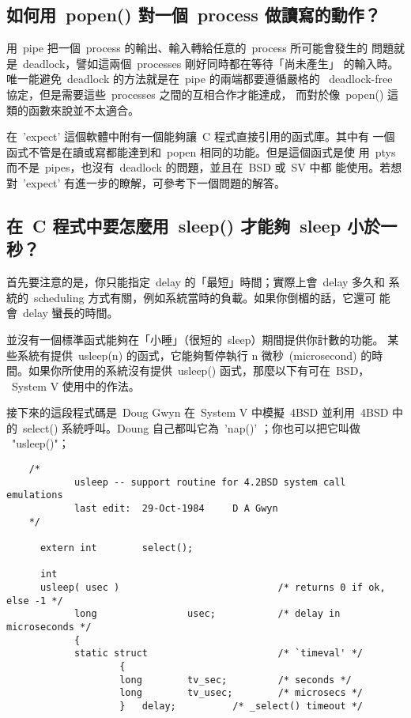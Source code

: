 \documentclass{article}
\begin{document}
\begin{CJK*}{Bg5}{ming}
\subsection{如何用~popen() 對一個~process 做讀寫的動作？}

	用~pipe 把一個~process 的輸出、輸入轉給任意的~process 所可能會發生的
        問題就是~deadlock，譬如這兩個~processes 剛好同時都在等待「尚未產生」
        的輸入時。唯一能避免~deadlock 的方法就是在~pipe 的兩端都要遵循嚴格的
	~deadlock-free 協定，但是需要這些~processes 之間的互相合作才能達成，
        而對於像~popen() 這類的函數來說並不太適合。

	在~'expect' 這個軟體中附有一個能夠讓~C 程式直接引用的函式庫。其中有
        一個函式不管是在讀或寫都能達到和~popen 相同的功能。但是這個函式是使
        用~ptys 而不是~pipes，也沒有~deadlock 的問題，並且在~BSD 或~SV 中都
        能使用。若想對~'expect' 有進一步的瞭解，可參考下一個問題的解答。

\subsection{在~C 程式中要怎麼用~sleep() 才能夠~sleep 小於一秒？}

	首先要注意的是，你只能指定~delay 的「最短」時間；實際上會~delay 多久和
	系統的~scheduling 方式有關，例如系統當時的負載。如果你倒楣的話，它還可
	能會~delay 蠻長的時間。

	並沒有一個標準函式能夠在「小睡」（很短的~sleep）期間提供你計數的功能。
	某些系統有提供~usleep(n) 的函式，它能夠暫停執行 n 微秒~(microsecond)
        的時間。如果你所使用的系統沒有提供~usleep() 函式，那麼以下有可在~BSD，
	~System V 使用中的作法。

	接下來的這段程式碼是~Doug Gwyn 在~System V 中模擬~4BSD 並利用~4BSD 
	中的~select() 系統呼叫。Doung 自己都叫它為~'nap()' ；你也可以把它叫做 
	~"usleep()"；
\footnotesize
\begin{verbatim}
	/*
            usleep -- support routine for 4.2BSD system call emulations
            last edit:  29-Oct-1984     D A Gwyn
	*/

      extern int        select();

      int
      usleep( usec )                            /* returns 0 if ok, else -1 */
       	    long                usec;           /* delay in microseconds */
            {
       	    static struct                       /* `timeval' */
               	    {
                    long        tv_sec;         /* seconds */
       	            long        tv_usec;        /* microsecs */
               	    }   delay;          /* _select() timeout */


\end{verbatim}
\end{CJK*}
\end{document}
